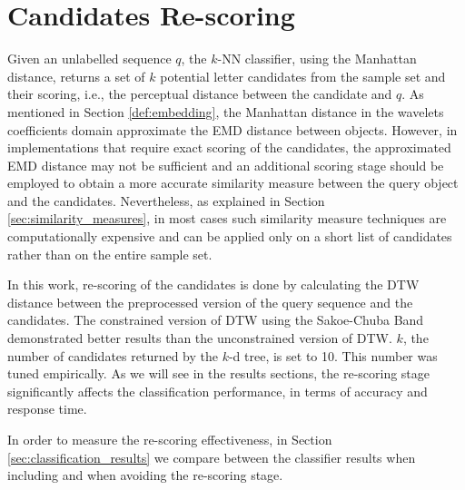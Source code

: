 \newpage{}

\section{Candidates Re-scoring}
\label{sec:candidates_scoring}
\iftoggle{edit-mode}{\hspace{0pt}\marginpar{The need for a re-scoring}}{} 
Given an unlabelled sequence $q$, the $k$-NN classifier, using the Manhattan distance, returns a set of $k$ potential letter candidates from the sample set and their scoring, i.e., the perceptual distance between the candidate and $q$.
As mentioned in Section \ref{def:embedding}, the Manhattan distance in the wavelets coefficients domain approximate the EMD distance between objects. 
However, in implementations that require exact scoring of the candidates, the approximated EMD distance may not be sufficient and an additional scoring stage should be employed to obtain a more accurate similarity measure between the query object and the candidates.
Nevertheless, as explained in Section \ref{sec:similarity_measures}, in most cases such similarity measure techniques are computationally expensive and can be applied only on a short list of candidates rather than on the entire sample set.   

\iftoggle{edit-mode}{\hspace{0pt}\marginpar{How re-scoring is done here}}{} 
In this work, re-scoring of the candidates is done by calculating the DTW distance between the preprocessed version of the query sequence and the candidates.
The constrained version of DTW using the Sakoe-Chuba Band \cite{sakoe1978dynamic} demonstrated better results than the unconstrained version of DTW.
$k$, the number of candidates returned by the $k$-d tree, is set to 10.
This number was tuned empirically.
As we will see in the results sections, the re-scoring stage significantly affects the classification performance, in terms of accuracy and response time.

\iftoggle{edit-mode}{\hspace{0pt}\marginpar{Re-scoring Effectiveness}}{} 
In order to measure the re-scoring effectiveness, in Section \ref{sec:classification_results} we compare between the classifier results when including and when avoiding the re-scoring stage.

\newpage{}

